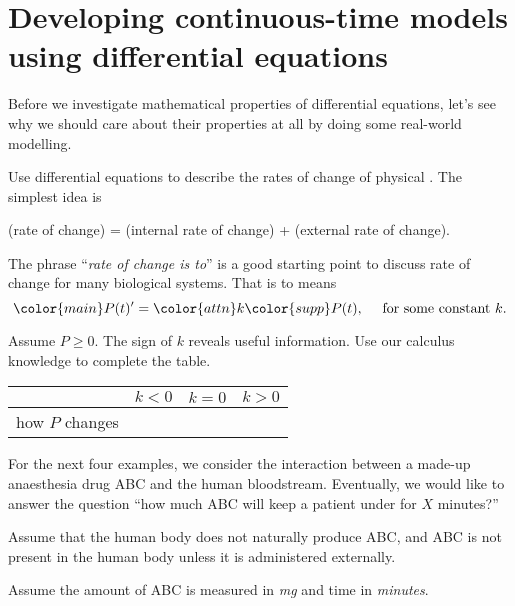 \documentclass[../main.tex]{subfiles}
\begin{document}
 \section{Developing continuous-time models using differential equations}

Before we investigate mathematical properties of differential equations, let's see why we should care about their properties at all by doing some real-world modelling. 

\begin{method}
  Use differential equations to describe the rates of change of physical .  The simplest idea is
  \begin{center}
    (rate of change) = (internal rate of change) + (external rate of change).
  \end{center}
\end{method}

The phrase ``\emph{rate of change is  to}'' is a good starting point to discuss  rate of change for many biological systems.  That  is  to  means 
\[
  {\color{main}P(t)'} = {\color{attn} k} {\color{supp} P(t)},\quad \text{ for some constant } k.
\]

Assume \(P \ge 0\).  The sign of \(k\) reveals useful information.  Use our calculus knowledge to complete the table.

\begin{table}[H]
  \centering
  \begin{tabular}{r|p{1.5in}|p{1.5in}|p{1.5in}}
  & \(k < 0\) & \(k = 0\) & \(k > 0\) \\ \midrule
    how \(P\) changes & & & \\[2ex]
  \end{tabular}
\end{table}

For the next four examples, we consider the interaction between a made-up anaesthesia drug ABC and the human bloodstream. Eventually, we would like to answer the question ``how much ABC will keep a patient under for \(X\) minutes?''

Assume that the human body does not naturally produce ABC, and ABC is not present in the human body unless it is administered externally. 

Assume the amount of ABC is measured in \emph{mg} and time in \emph{minutes}.
\end{document}
